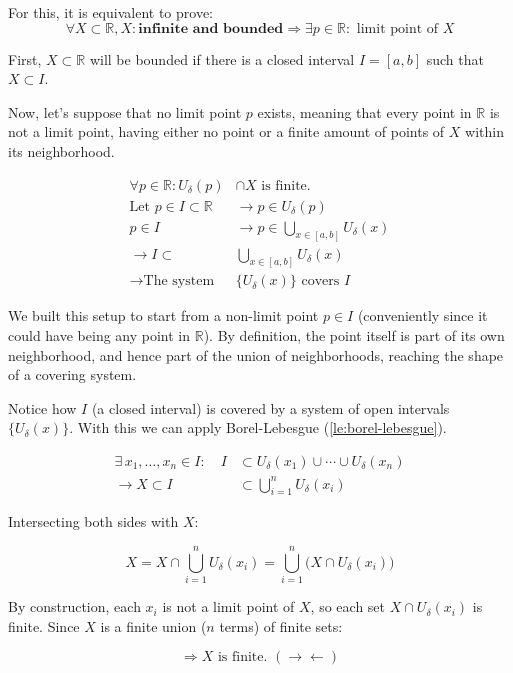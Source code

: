 \begin{bookproof}
For this, it is equivalent to prove:
$$\forall X \subset \mathbb{R}, X: \textbf{infinite and bounded} \Rightarrow \exists p \in \mathbb{R}: \text{ limit point of } X$$

First, $X \subset \mathbb{R}$ will be bounded if there is a closed interval $I = [a, b]$ such that $X \subset I$.

Now, let's suppose that no limit point $p$ exists, meaning that every point in $\mathbb{R}$ is not a limit point, having either no point or a finite amount of points of $X$ within its neighborhood.

\begin{align*}
\forall p \in \mathbb{R} : U_\delta(p) &\cap X \text{ is finite.}\\
\text{Let } p \in I \subset \mathbb{R} &\rightarrow p \in U_\delta(p)\\
p \in I &\rightarrow p \in \bigcup_{x \in [a,b]} U_\delta(x)\\
\rightarrow I \subset &\bigcup_{x \in [a,b]} U_\delta(x)\\
\rightarrow \text{The system } &\{U_\delta(x)\} \text{ covers } I
\end{align*}

We built this setup to start from a non-limit point $p \in I$ (conveniently since it could have being any point in $\mathbb{R}$). By definition, the point itself is part of its own neighborhood, and hence part of the union of neighborhoods, reaching the shape of a covering system.

Notice how $I$ (a closed interval) is covered by a system of open intervals $\{U_\delta(x)\}$. With this we can apply Borel-Lebesgue (\cref{le:borel-lebesgue}).

\begin{align*}
\exists \, x_1, \dots, x_n \in I : \quad I &\subset U_{\delta}(x_1) \cup \cdots \cup U_{\delta}(x_n)\\
\rightarrow X \subset I &\subset \bigcup_{i=1}^n U_{\delta}(x_i)
\end{align*}

Intersecting both sides with $X$:

$$X = X \cap \bigcup_{i=1}^n U_{\delta}(x_i) = \bigcup_{i=1}^n \big(X \cap U_{\delta}(x_i)\big)$$

By construction, each $x_i$ is not a limit point of $X$, so each set $X \cap U_{\delta}(x_i)$ is finite. Since $X$ is a finite union ($n$ terms) of finite sets:

$$\Rightarrow X \text{ is finite. } (\rightarrow\leftarrow)$$

\end{bookproof}
